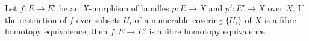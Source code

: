 Let $f \colon E \to E'$ be an $X$-morphism of bundles $p \colon E \to X$ and $p' \colon E' \to X$ over $X$. If the restriction of $f$ over subsets $U_i$ of a numerable covering $\{U_i\}$ of $X$ is a fibre homotopy equivalence, then $f \colon E \to E'$ is a fibre homotopy equivalence.
